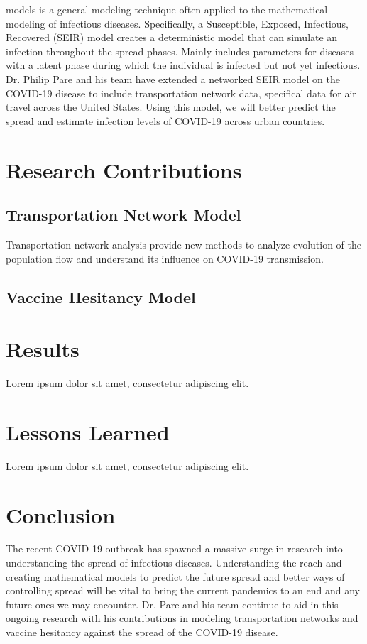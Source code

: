 \documentclass[journal,onecolumn]{IEEEtran}
\begin{document}
 models is a general modeling technique often applied to the mathematical modeling of infectious diseases. Specifically, a Susceptible, Exposed, Infectious, Recovered (SEIR) model creates a deterministic model that can simulate an infection throughout the spread phases. Mainly includes parameters for diseases with a latent phase during which the individual is infected but not yet infectious. Dr. Philip Pare and his team have extended a networked SEIR model on the COVID-19 disease to include transportation network data, specifical data for air travel across the United States. Using this model, we will better predict the spread and estimate infection levels of COVID-19 across urban countries. 

\section{Research Contributions}

\subsection{Transportation Network Model}

Transportation network analysis provide new methods to analyze evolution of the population flow and understand its influence on COVID-19 transmission. 

\subsection{Vaccine Hesitancy Model}

\section{Results}

Lorem ipsum dolor sit amet, consectetur adipiscing elit.

\section{Lessons Learned}

Lorem ipsum dolor sit amet, consectetur adipiscing elit.

\section{Conclusion}
The recent COVID-19 outbreak has spawned a massive surge in research into understanding the spread of infectious diseases. Understanding the reach and creating mathematical models to predict the future spread and better ways of controlling spread will be vital to bring the current pandemics to an end and any future ones we may encounter. Dr. Pare and his team continue to aid in this ongoing research with his contributions in modeling transportation networks and vaccine hesitancy against the spread of the COVID-19 disease. 
\end{document}
